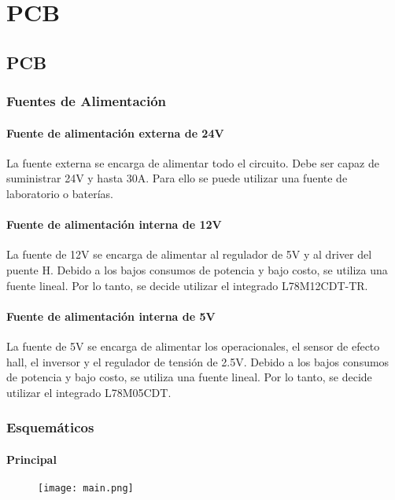 \chapter{PCB}  \label{cap:PCB}

\section{PCB}

\subsection{Fuentes de Alimentación}

\subsubsection{Fuente de alimentación externa de 24V}

\noindent La fuente externa se encarga de alimentar todo el circuito. Debe ser capaz de suministrar 24V y hasta 30A. Para ello se puede utilizar una fuente de laboratorio o baterías.

\subsubsection{Fuente de alimentación interna de 12V}

\noindent La fuente de 12V se encarga de alimentar al regulador de 5V y al driver del puente H. Debido a los bajos consumos de potencia y bajo costo, se utiliza una fuente lineal. Por lo tanto, se decide utilizar el integrado L78M12CDT-TR.

\subsubsection{Fuente de alimentación interna de 5V}

La fuente de 5V se encarga de alimentar los operacionales, el sensor de efecto hall, el inversor y el regulador de tensión de 2.5V. Debido a los bajos consumos de potencia y bajo costo, se utiliza una fuente lineal. Por lo tanto, se decide utilizar el integrado L78M05CDT.

\subsection{Esquemáticos}

\subsubsection{Principal}
\begin{figure}[H]
	\centering
	\texttt{[image: main.png]}
	\label{fig:main}
\end{figure}


